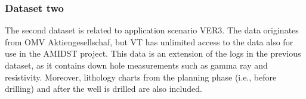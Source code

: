 \subsubsection{Dataset two} \label{sec:VT:Dataset:2}

The second dataset is related to  application scenario VER3. The data originates from OMV Aktiengesellschaf, but VT has unlimited access to the data also for use in the AMIDST project.  
This data  is an extension of the logs in the previous dataset,  as it contains down hole measurements such as gamma ray and resistivity.  Moreover, lithology charts from the planning phase (i.e., before drilling) and after the well is drilled are also included.
 
